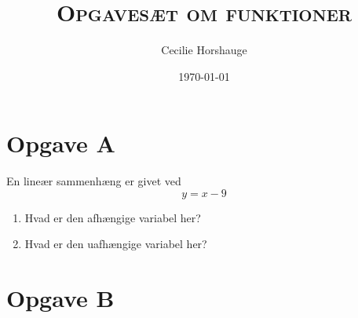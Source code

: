 \documentclass[a4paper, 11pt]{article}
\title{{\large \textsc{Opgavesæt om funktioner}}}
\author{Cecilie Horshauge}
\date{\today}
\begin{document}
\maketitle
\noindent 

\section*{Opgave A} 
En lineær sammenhæng er givet ved
\[y=x-9\]
\begin{enumerate}[label=\alph*)]
    \item Hvad er den afhængige variabel her?
    \item Hvad er den uafhængige variabel her?
\end{enumerate}

\section*{Opgave B} 
\end{document}
